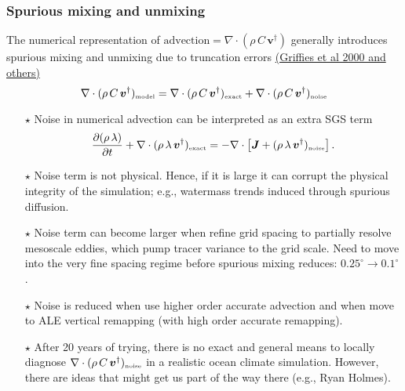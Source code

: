 \documentclass[10pt]{beamer}
\begin{document}
\begin{frame}
  \frametitle{Spurious mixing and unmixing}

  The numerical representation of
  $\mbox{advection} = \nabla \cdot ( \rho \, C \, {\bm v}^{\dagger})$
  generally introduces spurious mixing and unmixing due to truncation
  errors
  \href{https://doi.org/10.1175/1520-0493(2000)128<0538:SDMAWA>2.0.CO;2}{(Griffies
    et al 2000 and others)}
\begin{equation}
   \nabla \cdot ( \rho \, C \, {\bm v}^{\dagger})_{\mbox{\tiny model}} = 
   \nabla \cdot ( \rho \, C \, {\bm v}^{\dagger})_{\mbox{\tiny exact}} 
  +
 \nabla \cdot ( \rho \, C \, {\bm v}^{\dagger})_{\mbox{\tiny noise}}
\end{equation}

\begin{exampleblock}{}
\begin{itemize}
\item[$\star$] Noise in numerical advection can be interpreted as an
  extra SGS term
\begin{equation}
   \frac{\partial (\rho \, \lambda)}{\partial t} + \nabla \cdot (\rho \, \lambda \, {\bm v}^{\dagger} )_{\mbox{\tiny exact}} 
 = -\nabla \cdot \left[  {\bm J} + (\rho \, \lambda \, {\bm v}^{\dagger} )_{\mbox{\tiny noise}} \right]. 
\end{equation}

\item[$\star$] Noise term is not physical.  Hence, if it is large it
  can corrupt the physical integrity of the simulation; e.g.,
  watermass trends induced through spurious diffusion.

\item[$\star$] Noise term can become larger when refine grid spacing
  to partially resolve mesoscale eddies, which pump tracer variance to
  the grid scale.  Need to move into the very fine spacing regime
  before spurious mixing reduces:
  $0.25^{\circ} \longrightarrow 0.1^{\circ}$.

\item[$\star$] Noise is reduced when use higher order accurate
  advection and when move to ALE vertical remapping (with high order
  accurate remapping). 

\item[$\star$] After 20 years of trying, there is no exact and general
  means to locally diagnose
  $\nabla \cdot ( \rho \, C \, {\bm v}^{\dagger})_{\mbox{\tiny
      noise}}$
  in a realistic ocean climate simulation.  However, there are ideas
  that might get us part of the way there (e.g., Ryan Holmes).

\end{itemize}
\end{exampleblock}{}


\end{frame}
\end{document}
